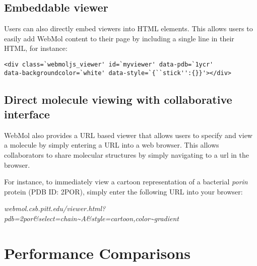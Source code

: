 \documentclass[]{article}
\begin{document}
\subsection{Embeddable viewer}
Users can also directly embed viewers into HTML elements. This allows users to easily add WebMol content to their page by including a single line in their HTML, for instance:

\begin{verbatim}
<div class=`webmoljs_viewer' id=`myviewer' data-pdb=`1ycr' 
data-backgroundcolor=`white' data-style=`{``stick'':{}}'></div>
\end{verbatim}

\subsection{Direct molecule viewing with collaborative interface}
WebMol also provides a URL based viewer that allows users to specify and view a molecule by simply entering a URL into a web browser.  This allows collaborators to share molecular structures by simply navigating to a url in the browser. 

For instance, to immediately view a cartoon representation of a bacterial \emph{porin} protein (PDB ID: 2POR), simply enter the following URL into your browser:

\emph{webmol.csb.pitt.edu/viewer.html?pdb=2por\&select=chain\~{}A\&style=cartoon,color\~{}gradient}

\section{Performance Comparisons}
\end{document}
